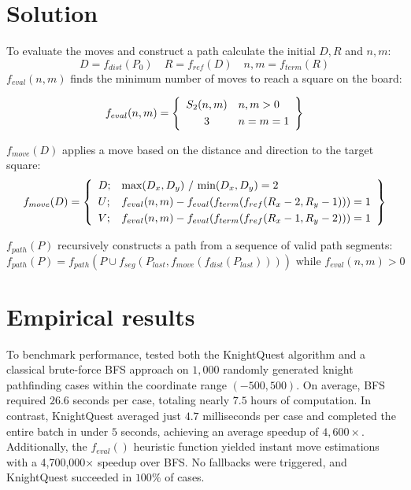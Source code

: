 \documentclass[a4paper, 12pt]{article}
\begin{document}
\section{Solution}
To evaluate the moves and construct a path calculate the initial \( D, R \) and \( n, m \):
\[
D = f_{dist}(P_0) \hspace{1em} R = f_{ref}(D) \hspace{1em} n,m = f_{term}(R)
\]
\( f_{eval}(n,m) \) finds the minimum number of moves to reach a square on the board:

\vspace{0.6em}
\[
f_{eval}(n,m) = \left\{
\begin{array}{c l}
S_2(n,m) & n,m > 0 \\[3pt]
3 & n = m = 1
\end{array}
\right\}
\]

\vspace{0.6em}
\noindent \( f_{move}(D) \) applies a move based on the distance and direction to the target square:
\vspace{0.6em}
\[
f_{move}(D) = \left\{
\begin{array}{l l}
D; & \text{max}(D_x,D_y) \ / \ \text{min}(D_x,D_y) = 2 \\[3pt]
U; & f_{eval}(n,m) - f_{eval}(f_{term}(f_{ref}(R_x - 2, R_y - 1))) = 1 \\[3pt]
V; & f_{eval}(n,m) - f_{eval}(f_{term}(f_{ref}(R_x - 1, R_y - 2))) = 1
\end{array}
\right\}
\]

\vspace{0.6em}
\noindent \( f_{path}(P) \) recursively constructs a path from a sequence of valid path segments:
\vspace{0.6em}
\[
f_{path}(P) = f_{path}(P \cup f_{seg}(P_{last}, f_{move}(f_{dist}(P_{last})))) \text{ while } f_{eval}(n,m) > 0
\]
\newpage


\section{Empirical results}
\noindent To benchmark performance, tested both the KnightQuest algorithm and a classical brute-force BFS approach 
on \( 1,000 \) randomly generated knight pathfinding cases within the coordinate range \( (-500, 500) \). On average, 
BFS required \( 26.6 \) seconds per case, totaling nearly \( 7.5 \) hours of computation. In contrast, KnightQuest 
averaged just \( 4.7 \) milliseconds per case and completed the entire batch in under \( 5 \) seconds, achieving an 
average speedup of \( 4,600× \). Additionally, the \( f_{eval}() \) heuristic function yielded instant move estimations 
with a 4,700,000× speedup over BFS. No fallbacks were triggered, and KnightQuest succeeded in \( 100 \% \) of cases.
\end{document}
